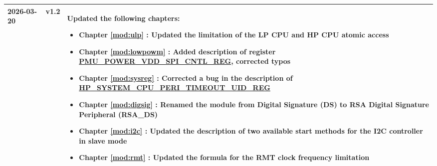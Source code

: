 \begin{longtable}[l]{ | m{2cm} | m{1.5cm} | m{12cm} | }
    \\\hline
    2026-03-20 & v1.2 &
    Updated the following chapters:
    \begin{itemize}
        \item Chapter \ref{mod:ulp} \textit{\nameref{mod:ulp}}: Updated the limitation of the LP CPU and HP CPU atomic access %
        \item Chapter \ref{mod:lowpowm} \textit{\nameref{mod:lowpowm}}: Added description of register \hyperref[regdesc:PMUPOWERVDDSPICNTLREG]{PMU\_POWER\_VDD\_SPI\_CNTL\_REG}, corrected typos %
        \item Chapter \ref{mod:sysreg} \textit{\nameref{mod:sysreg}}: Corrected a bug in the description of \hyperref[regdesc:HPSYSTEMCPUPERITIMEOUTUIDREG]{HP\_SYSTEM\_CPU\_PERI\_TIMEOUT\_UID\_REG} %
        \item Chapter \ref{mod:digsig} \textit{\nameref{mod:digsig}}: Renamed the module from Digital Signature (DS) to RSA Digital Signature Peripheral (RSA\_DS) %
        \item Chapter \ref{mod:i2c} \textit{\nameref{mod:i2c}}: Updated the description of two available start methods for the I2C controller in slave mode %
        \item Chapter \ref{mod:rmt} \textit{\nameref{mod:rmt}}: Updated the formula for the RMT clock frequency limitation %
    \end{itemize}
    \\\hline


\end{longtable}
